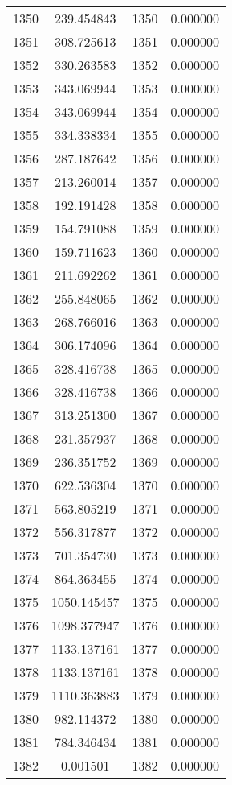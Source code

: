 \documentclass[12pt]{article}
\begin{document}
\begin{longtable}{@{}cccc@{}}
1350 & 239.454843 & 1350 & 0.000000 \\
1351 & 308.725613 & 1351 & 0.000000 \\
1352 & 330.263583 & 1352 & 0.000000 \\
1353 & 343.069944 & 1353 & 0.000000 \\
1354 & 343.069944 & 1354 & 0.000000 \\
1355 & 334.338334 & 1355 & 0.000000 \\
1356 & 287.187642 & 1356 & 0.000000 \\
1357 & 213.260014 & 1357 & 0.000000 \\
1358 & 192.191428 & 1358 & 0.000000 \\
1359 & 154.791088 & 1359 & 0.000000 \\
1360 & 159.711623 & 1360 & 0.000000 \\
1361 & 211.692262 & 1361 & 0.000000 \\
1362 & 255.848065 & 1362 & 0.000000 \\
1363 & 268.766016 & 1363 & 0.000000 \\
1364 & 306.174096 & 1364 & 0.000000 \\
1365 & 328.416738 & 1365 & 0.000000 \\
1366 & 328.416738 & 1366 & 0.000000 \\
1367 & 313.251300 & 1367 & 0.000000 \\
1368 & 231.357937 & 1368 & 0.000000 \\
1369 & 236.351752 & 1369 & 0.000000 \\
1370 & 622.536304 & 1370 & 0.000000 \\
1371 & 563.805219 & 1371 & 0.000000 \\
1372 & 556.317877 & 1372 & 0.000000 \\
1373 & 701.354730 & 1373 & 0.000000 \\
1374 & 864.363455 & 1374 & 0.000000 \\
1375 & 1050.145457 & 1375 & 0.000000 \\
1376 & 1098.377947 & 1376 & 0.000000 \\
1377 & 1133.137161 & 1377 & 0.000000 \\
1378 & 1133.137161 & 1378 & 0.000000 \\
1379 & 1110.363883 & 1379 & 0.000000 \\
1380 & 982.114372 & 1380 & 0.000000 \\
1381 & 784.346434 & 1381 & 0.000000 \\
1382 & 0.001501 & 1382 & 0.000000 \\

\end{longtable}
\end{document}
